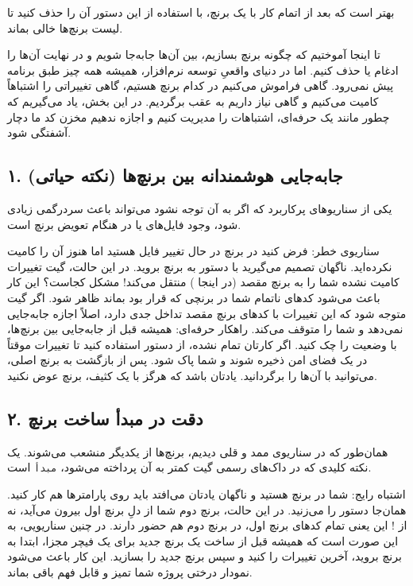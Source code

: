 بهتر است که بعد از اتمام کار با یک برنچ، با استفاده از این دستور آن را
حذف کنید تا لیست برنچ‌ها خالی بماند.

تا اینجا آموختیم که چگونه برنچ بسازیم، بین آن‌ها جابه‌جا شویم و در نهایت
آن‌ها را ادغام یا حذف کنیم. اما در دنیای واقعیِ توسعه نرم‌افزار، همیشه همه
چیز طبق برنامه پیش نمی‌رود. گاهی فراموش می‌کنیم در کدام برنچ هستیم، گاهی
تغییراتی را اشتباهاً کامیت می‌کنیم و گاهی نیاز داریم به عقب برگردیم. در
این بخش، یاد می‌گیریم که چطور مانند یک حرفه‌ای، اشتباهات را مدیریت کنیم و
اجازه ندهیم مخزن کد  ما دچار آشفتگی شود.

\subsection{۱. جابه‌جایی هوشمندانه بین برنچ‌ها (نکته حیاتی)}

یکی از سناریوهای پرکاربرد که اگر به آن توجه نشود می‌تواند باعث سردرگمی
زیادی شود، وجود فایل‌های  یا  در هنگام تعویض
برنچ است.

سناریوی خطر: فرض کنید در برنچ  در حال تغییر فایل
 هستید اما هنوز آن را کامیت نکرده‌اید. ناگهان
تصمیم می‌گیرید با دستور  به برنچ
 بروید. در این حالت، گیت تغییرات کامیت نشده شما را به
برنچ مقصد (در اینجا ) منتقل می‌کند! مشکل کجاست؟ این کار
باعث می‌شود کدهای ناتمام شما در برنچی که قرار بود  بماند ظاهر
شود. اگر گیت متوجه شود که این تغییرات با کدهای برنچ مقصد تداخل جدی دارد،
اصلاً اجازه جابه‌جایی نمی‌دهد و شما را متوقف می‌کند. راهکار حرفه‌ای: همیشه
قبل از جابه‌جایی بین برنچ‌ها، با  وضعیت را چک
کنید. اگر کارتان تمام نشده، از دستور  استفاده
کنید تا تغییرات موقتاً در یک فضای امن ذخیره شوند و
 شما پاک  شود. پس از بازگشت
به برنچ اصلی، می‌توانید با  آن‌ها را برگردانید.
یادتان باشد که هرگز با یک  کثیف، برنچ عوض
نکنید.

\subsection{۲. دقت در مبدأ ساخت برنچ }

همان‌طور که در سناریوی ممد و قلی دیدیم، برنچ‌ها از یکدیگر منشعب می‌شوند. یک
نکته کلیدی که در داک‌های رسمی گیت کمتر به آن پرداخته می‌شود، \texttt{مبدأ}
است.

اشتباه رایج: شما در برنچ  هستید و ناگهان یادتان
می‌افتد باید روی پارامترها هم کار کنید. همان‌جا دستور
 را می‌زنید. در این حالت، برنچ
دوم شما از دلِ برنچ اول بیرون می‌آید، نه از ! این یعنی
تمام کدهای برنچ اول، در برنچ دوم هم حضور دارند. در چنین سناریویی،
 به این صورت است که همیشه قبل از ساخت یک برنچ
جدید برای یک فیچر مجزا، ابتدا به برنچ  بروید، آخرین
تغییرات را  کنید و سپس برنچ جدید را بسازید. این کار
باعث می‌شود نمودار درختی پروژه شما  تمیز و قابل فهم
باقی بماند.

